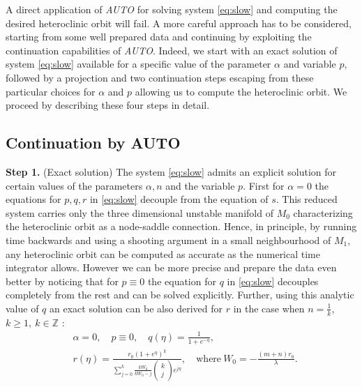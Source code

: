\documentclass[11pt]{article}
\theoremstyle{remark}
\begin{document}
A direct application of \emph{AUTO} for solving system \eqref{eq:slow} and computing the desired  heteroclinic orbit will fail. A more careful approach has to be considered, starting from some well prepared data and continuing by exploiting the continuation capabilities of \emph{AUTO}.
Indeed, we start with an exact solution of system  \eqref{eq:slow} available for  a specific value of the parameter $\alpha$ and variable $p$, followed by a projection and two continuation steps escaping from these particular choices for $\alpha$ and $p$ allowing us to  compute the heteroclinic orbit.
We proceed by describing these four steps in detail.


\subsection{Continuation by AUTO}\label{sec:contauto}

{\bf Step 1.} (Exact solution) The system \eqref{eq:slow} admits an explicit solution for certain values of the parameters $\alpha, n$ and the variable $p$. First for $\alpha=0$  the equations for $p, q, r$ in \eqref{eq:slow} decouple from the equation of $s$. This reduced system carries only the three dimensional unstable manifold of $M_0$ characterizing the heteroclinic orbit as a node-saddle connection. Hence, in principle, by running time backwards and using a shooting argument in a small neighbourhood of $M_1$, any heteroclinic orbit can be computed as accurate as the numerical time integrator allows. However we can be more precise and prepare the data even better by
noticing that for $p\equiv 0$ the equation for $q$ in \eqref{eq:slow} decouples completely from the rest and can be solved explicitly. Further, using this analytic value of $q$ an exact solution can be also derived for $r$ in the case when $\displaystyle n=\frac{1}{k}$, $k \ge 1, \ k\in \mathbb{Z}$ :
\begin{equation}
\label{exa0p0}
\begin{aligned}
 &\alpha=0, \quad p\equiv0, \quad q(\eta) = \frac{1}{1+e^{-\eta}},\\
 & r(\eta) = \frac{r_0 \left(1 + e^{\eta}\right)^k}{ \displaystyle \sum_{j=0}^k \frac{kW_0}{kW_0 -j}\begin{pmatrix} k\\j\end{pmatrix} e^{j\eta}} , \quad \text{where}\ W_0= - \frac{(m+n)r_0}{\lambda}.
\end{aligned}
\end{equation}
\end{document}
